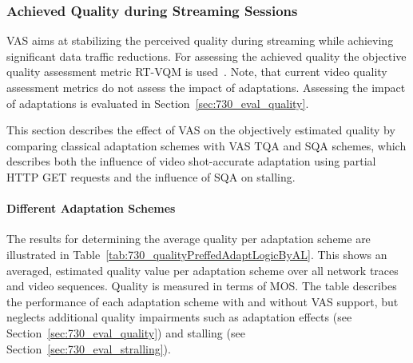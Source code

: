 \subsubsection{Achieved Quality during Streaming Sessions}
\label{sec:730_objectiveQualityVAS}
\ac{VAS} aims at stabilizing the perceived quality during streaming while achieving significant data traffic reductions.
For assessing the achieved quality the objective quality assessment metric \ac{RT-VQM} is used~\cite{Wichtlhuber2016}. 
Note, that current video quality assessment metrics do not assess the impact of adaptations.
Assessing the impact of adaptations is evaluated in Section~\ref{sec:730_eval_quality}.

This section describes the effect of \ac{VAS} on the objectively estimated quality by comparing classical adaptation schemes with \ac{VAS} \ac{TQA} and \ac{SQA} schemes, which describes both the influence of video shot-accurate adaptation using partial HTTP GET requests and the influence of \ac{SQA} on stalling.
\paragraph{Different Adaptation Schemes}
The results for determining the average quality per adaptation scheme are illustrated in Table~\ref{tab:730_qualityPreffedAdaptLogicByAL}. This shows an averaged, estimated quality value per adaptation scheme over all network traces and video sequences.
Quality is measured in terms of \ac{MOS}.
The table describes the performance of each adaptation scheme with and without \ac{VAS} support, but neglects additional quality impairments such as adaptation effects (see Section~\ref{sec:730_eval_quality}) and stalling (see Section~\ref{sec:730_eval_stralling}).

